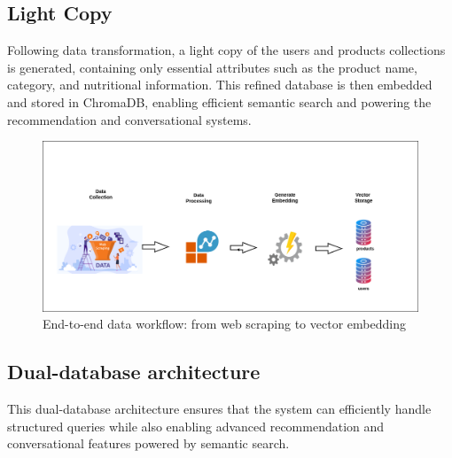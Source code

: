 \subsection{Light Copy}
Following data transformation, a light copy of the users and products collections is generated, containing only essential attributes such as the product name, category, and nutritional information. This refined database is then embedded and stored in ChromaDB, enabling efficient semantic search and powering the recommendation and conversational systems.

\begin{center}
\begin{figure}[H]
    \includegraphics[scale=0.35]{images/workflow__data.png}
    \caption{End-to-end data workflow: from web scraping to vector embedding}
    \label{fig:data_workflow}
\end{figure}
\end{center}


\subsection{Dual-database architecture}
 
This dual-database architecture ensures that the system can efficiently handle structured queries while also enabling advanced recommendation and conversational features powered by semantic search. 


